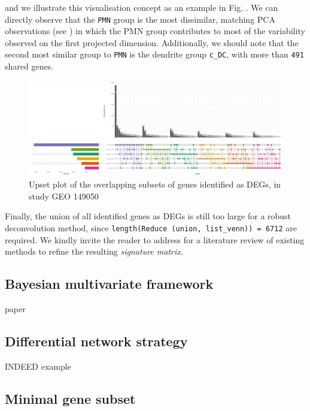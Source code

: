 and we illustrate this visualisation concept as an example in Fig. . We can directly observe that the \texttt{PMN} group is the most dissimilar, matching PCA observations (see ) in which the PMN group contributes to most of the variability observed on the first projected dimension. Additionally, we should note that the second most similar group to \texttt{PMN} is the dendrite group \texttt{c\_DC}, with more than \texttt{491} shared genes.

\begin{figure}

{\centering \includegraphics[width=0.9\linewidth]{./figures/upset_plot_all_contrasts} 

}

\caption{Upset plot of the overlapping subsets of genes identified as DEGs, in study GEO 149050}\label{fig:advanced-upset-plot}
\end{figure}

Finally, the union of all identified genes as DEGs is still too large for a robust deconvolution method, since \texttt{length(Reduce\ (union,\ list\_venn))\ =\ 6712} are required. We kindly invite the reader to address  for a literature review of existing methods to refine the resulting \emph{signature matrix}.


\subsection{Bayesian multivariate framework} 
\label{bayesian-multivariate-framework}

\autocite{chion_etal22} paper


\subsection{Differential network strategy} 
\label{differential-network-strategy}

INDEED example


\subsection{Minimal gene subset} 
\label{subsec:feature-selection}


